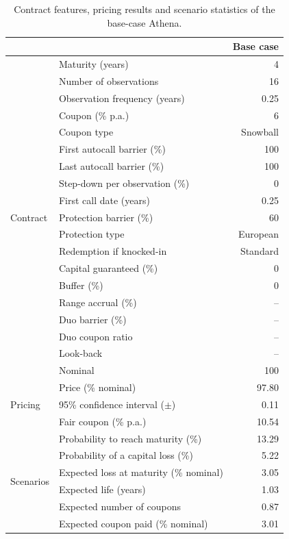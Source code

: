 \documentclass[11pt,a4paper]{article}
\begin{document}
\begin{table}[htbp]
  \centering
  \small
  \begin{tabular}{llr}
    \toprule
     & & \textbf{Base case} \\
    \midrule
    \multirow{19}{*}{Contract}
      & Maturity (years)                    & 4 \\
      & Number of observations              & 16 \\
      & Observation frequency (years)       & 0.25 \\
      & Coupon (\% p.a.)                    & 6 \\
      & Coupon type                         & Snowball \\
      & First autocall barrier (\%)         & 100 \\
      & Last autocall barrier (\%)          & 100 \\
      & Step-down per observation (\%)      & 0 \\
      & First call date (years)             & 0.25 \\
      & Protection barrier (\%)             & 60 \\
      & Protection type                     & European \\
      & Redemption if knocked-in            & Standard \\
      & Capital guaranteed (\%)             & 0 \\
      & Buffer (\%)                         & 0 \\
      & Range accrual (\%)                  & -- \\
      & Duo barrier (\%)                    & -- \\
      & Duo coupon ratio                    & -- \\
      & Look-back                           & -- \\
      & Nominal                             & 100 \\
    \midrule
    \multirow{3}{*}{Pricing}
      & Price (\% nominal)                  & 97.80 \\
      & 95\% confidence interval ($\pm$)    & 0.11 \\
      & Fair coupon (\% p.a.)               & 10.54 \\
    \midrule
    \multirow{6}{*}{Scenarios}
      & Probability to reach maturity (\%)  & 13.29 \\
      & Probability of a capital loss (\%)  & 5.22 \\
      & Expected loss at maturity (\% nominal) & 3.05 \\
      & Expected life (years)               & 1.03 \\
      & Expected number of coupons          & 0.87 \\
      & Expected coupon paid (\% nominal)   & 3.01 \\
    \bottomrule
  \end{tabular}
  \caption{Contract features, pricing results and scenario statistics of the
           base-case Athena.}
  \label{tab:athena-base-case-results}
\end{table}
\end{document}
